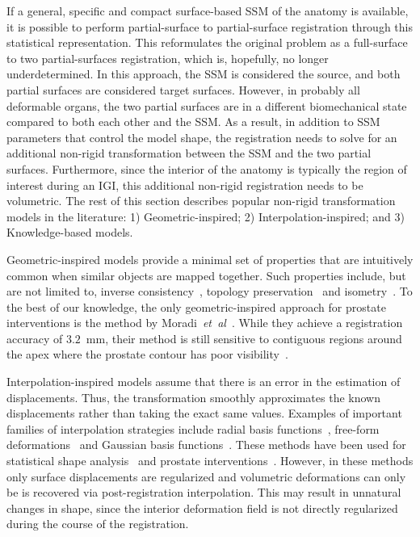 \documentclass[journal]{IEEEtran}
\begin{document}
If a general, specific and compact surface-based SSM of the anatomy is available, it is possible to perform partial-surface to partial-surface registration through this statistical representation. This reformulates the original problem as a full-surface to two partial-surfaces registration, which is, hopefully, no longer underdetermined. In this approach, the SSM is considered the source, and both partial surfaces are considered target surfaces. However, in probably all deformable organs, the two partial surfaces are in a different biomechanical state compared to both each other and the SSM. As a result, in addition to SSM parameters that control the model shape, the registration needs to solve for an additional non-rigid transformation between the SSM and the two partial surfaces. Furthermore, since the interior of the anatomy is typically the region of interest during an IGI, this additional non-rigid registration needs to be volumetric. The rest of this section describes popular non-rigid transformation models in the literature: 1) Geometric-inspired; 2) Interpolation-inspired; and 3) Knowledge-based models.

Geometric-inspired models provide a minimal set of properties that are intuitively common when similar objects are mapped together. Such properties include, but are not limited to, inverse consistency~\cite{Combes10a}, topology preservation~\cite{Huang07a,Yeo10a,Moradi12a} and isometry~\cite{Zheng10a}. To the best of our knowledge, the only geometric-inspired approach for prostate interventions is the method by Moradi~\textit{et~al}~\cite{Moradi12a}. While they achieve a registration accuracy of $3.2$~mm, their method is still sensitive to contiguous regions around the apex where the prostate contour has poor visibility~\cite{Moradi12a}. 

Interpolation-inspired models assume that there is an error in the estimation of displacements. Thus, the transformation smoothly approximates the known displacements rather than taking the exact same values. Examples of important families of interpolation strategies include radial basis functions~\cite{Chui03a}, free-form deformations~\cite{Wang08a} and Gaussian basis functions~\cite{Myronenko10a}. These methods have been used for statistical shape analysis~\cite{Zhang13a,Rasoulian12b,Achuthan13a} and prostate interventions~\cite{Makni10a,Makni12a}. However, in these methods only surface displacements are regularized and volumetric deformations can only be is recovered via post-registration interpolation. This may result in unnatural changes in shape, since the interior deformation field is not directly regularized during the course of the registration.
\end{document}
